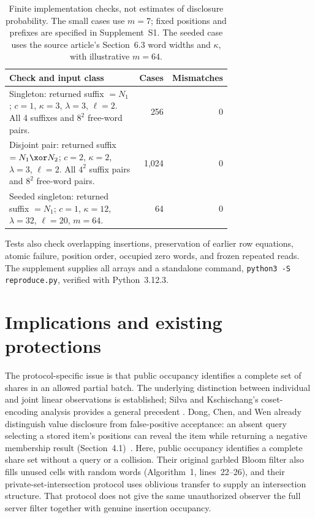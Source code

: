 \begin{table}[ht]
\centering
\small
\begin{tabular}{@{}>{\raggedright\arraybackslash}p{0.72\linewidth}rr@{}}
\toprule
Check and input class & Cases & Mismatches\\
\midrule
Singleton: returned suffix $=N_1$; $c=1$, $\kappa=3$,
$\lambda=3$, $\ell=2$. All 4 suffixes and $8^2$ free-word pairs.
& 256 & 0\\[3pt]
Disjoint pair: returned suffix $=N_1\xor N_2$; $c=2$, $\kappa=2$,
$\lambda=3$, $\ell=2$. All $4^2$ suffix pairs and $8^2$ free-word pairs.
& 1,024 & 0\\[3pt]
Seeded singleton: returned suffix $=N_1$; $c=1$, $\kappa=12$,
$\lambda=32$, $\ell=20$, $m=64$.
& 64 & 0\\
\bottomrule
\end{tabular}
\caption{Finite implementation checks, not estimates of disclosure probability.
The small cases use $m=7$; fixed positions and prefixes are specified in
Supplement~S1. The seeded case uses the source article's Section~6.3 word widths
and $\kappa$, with illustrative $m=64$.}
\label{tab:checks}
\end{table}

Tests also check overlapping insertions, preservation of earlier row equations,
atomic failure, position order, occupied zero words, and frozen repeated reads.
The supplement supplies all arrays and a standalone command,
\texttt{python3 -S reproduce.py}, verified with Python~3.12.3.

\section{Implications and existing protections}

The protocol-specific issue is that public occupancy identifies a complete
set of shares in an allowed partial batch. The underlying distinction between
individual and joint linear observations is established; Silva and
Kschischang's coset-encoding analysis provides a general precedent
\cite{silva2011universal}. Dong, Chen, and Wen already distinguish value
disclosure from false-positive acceptance: an absent query selecting a stored item's
positions can reveal the item while returning a negative membership result
(Section~4.1)~\cite{dong2013gbf}. Here, public occupancy identifies a complete
share set without a query or a collision. Their original garbled Bloom filter
also fills unused cells with random words (Algorithm~1, lines~22--26), and their
private-set-intersection protocol uses oblivious transfer to supply an
intersection structure.
That protocol does not give the same unauthorized observer the full server
filter together with genuine insertion occupancy.

